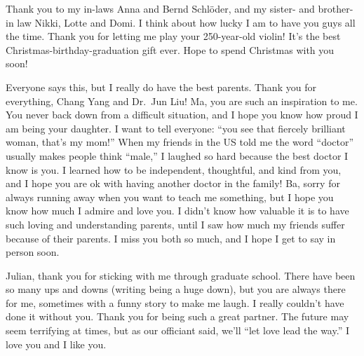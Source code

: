 Thank you to my in-laws Anna and Bernd Schl\"oder, and my sister- and brother-in law Nikki, Lotte and Domi. I think about how lucky I am to have you guys all the time. Thank you for letting me play your 250-year-old violin! It's the best Christmas-birthday-graduation gift ever. Hope to spend Christmas with you soon!
 
Everyone says this, but I really do have the best parents. Thank you for everything, Chang Yang and Dr.~Jun Liu! Ma, you are such an inspiration to me. You never back down from a difficult situation, and I hope you know how proud I am being your daughter. I want to tell everyone: “you see that fiercely brilliant woman, that’s my mom!” When my friends in the US told me the word “doctor” usually makes people think ``male,'' I laughed so hard because the best doctor I know is you. I learned how to be independent, thoughtful, and kind from you, and I hope you are ok with having another doctor in the family! Ba, sorry for always running away when you want to teach me something, but I hope you know how much I admire and love you. I didn’t know how valuable it is to have such loving and understanding parents, until I saw how much my friends suffer because of their parents. I miss you both so much, and I hope I get to say  in person soon.
 
Julian, thank you for sticking with me through graduate school. There have been so many ups and downs (writing being a huge down), but you are always there for me, sometimes with a funny story to make me laugh. I really couldn't have done it without you. Thank you for being such a great partner. The future may seem terrifying at times, but as our officiant said, we’ll “let love lead the way.” I love you and I like you.
 
 

